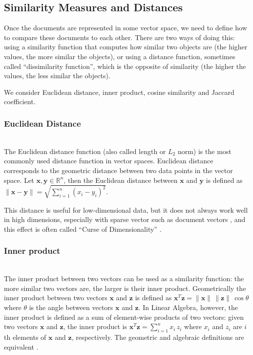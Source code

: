 \subsection{Similarity Measures and Distances} \label{sec:similarity-distance}

Once the documents are represented in some vector space, we need to
define how to compare these documents to each other. There are two
ways of doing this: using a similarity function that computes how similar
two objects are (the higher values, the more similar the objects),
or using a distance function, sometimes called ``dissimilarity function'',
which is the opposite of similarity (the higher the values, the less similar
the objects).

We consider Euclidean distance, inner product, cosine similarity and
Jaccard coefficient.


\subsubsection{Euclidean Distance} \ \\

The Euclidean distance function (also called length or $L_2$ norm) 
is the most commonly used distance function in vector spaces. 
Euclidean distance corresponds to the geometric distance between two data 
points in the vector space. Let $\mathbf x, \mathbf y \in \mathbb R^n$, then 
the Euclidean distance between $\mathbf x$ and $\mathbf y$ is defined 
as $\| \mathbf x - \mathbf y \| = \sqrt{\sum_{i = 1}^n (x_i - y_i)^2}$.


This distance is useful for low-dimensional data, but it does not always work
well in high dimensions, especially with sparse vector such as
document vectors \cite{ertoz2003finding}, and this effect is often called 
``Curse of Dimensionality'' \cite{beyer1999nearest}.


\subsubsection{Inner product} \ \\

The inner product between two vectors can be used as a similarity function:
the more similar two vectors are, the larger is their inner product.
Geometrically the inner product between two vectors $\mathbf x$ and $\mathbf z$
is defined as
$\mathbf x^T \mathbf z = \|\mathbf x \| \, \| \mathbf z \| \, \cos \theta$
where $\theta$ is the angle between vectors $\mathbf x$ and $\mathbf z$.
In Linear Algebra, however, the inner product
is defined as a sum of element-wise products of two vectors:
given two vectors $\mathbf x$ and $\mathbf z$, the inner product is
$\mathbf x^T \mathbf z = \sum_{i = 1}^n x_i \, z_i$ where $x_i$ and $z_i$
are $i$th elements of $\mathbf x$ and $\mathbf z$, respectively.
The geometric and algebraic definitions are equivalent \cite{huges2013calculus}.




